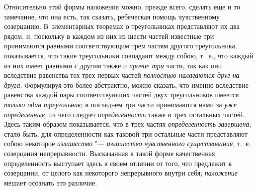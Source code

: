 Относительно этой формы наложения можно, прежде всего, сделать еще и то
замечание, что она есть, так сказать, ребяческая помощь чувственному
созерцанию. В~элементарных теоремах о треугольниках представляют их два
рядом, и, поскольку в каждом из них из шести частей известные три
принимаются равными соответствующим трем частям другого треугольника,
показывается, что такие треугольники совпадают между собою, т.~е., что
каждый из них имеет равными с другим также и
{\em прочие три} части, так как они вследствие
равенства тех трех первых частей {\em полностью
налагаются друг на друга}. Формулируя это более абстрактно, можно сказать,
что именно вследствие равенства каждой пары соответствующих частей двух
треугольников имеется {\em только один треугольник}; в
последнем три части принимаются нами за {\em уже
определенные}, из чего следует {\em определенность}
также и трех остальных частей. Здесь таким образом показывается, что в трех
частях {\em определенность}
{\em завершена}; стало быть, для определенности как
таковой три остальные части представляют собою некоторое
{\em излишество} "--- {\em излишество
чувственного существования}, т.~е. созерцания непрерывности. Высказанная в
такой форме качественная определенность выступает здесь в своем отличии от
того, что предлежит в созерцании, от целого как некоторого непрерывного
внутри себя; {\em наложение} мешает осознать это
различие.


